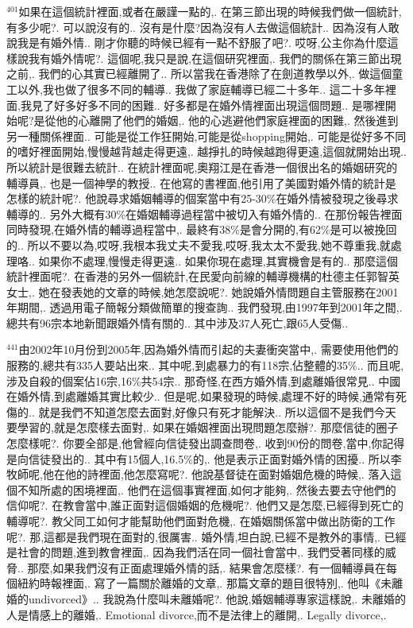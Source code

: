 \documentclass{book}
\begin{document}
$^{401}$如果在這個統計裡面,或者在嚴謹一點的,.
在第三節出現的時候我們做一個統計,有多少呢?.
可以說沒有的..
沒有是什麼?因為沒有人去做這個統計..
因為沒有人敢說我是有婚外情..
剛才你聽的時候已經有一點不舒服了吧?.
哎呀,公主你為什麼這樣說我有婚外情呢?.
這個呢,我只是說,在這個研究裡面,.
我們的關係在第三節出現之前,.
我們的心其實已經離開了..
所以當我在香港除了在劍道教學以外,.
做這個童工以外,我也做了很多不同的輔導..
我做了家庭輔導已經二十多年..
這二十多年裡面,我見了好多好多不同的困難..
好多都是在婚外情裡面出現這個問題..
是哪裡開始呢?是從他的心離開了他們的婚姻,.
他的心逃避他們家庭裡面的困難,.
然後進到另一種關係裡面..
可能是從工作狂開始,可能是從shopping開始,.
可能是從好多不同的嗜好裡面開始,慢慢越背越走得更遠,.
越掙扎的時候越跑得更遠,這個就開始出現..
所以統計是很難去統計..
在統計裡面呢,奧翔江是在香港一個很出名的婚姻研究的輔導員,.
也是一個神學的教授..
在他寫的書裡面,他引用了美國對婚外情的統計是怎樣的統計呢?.
他說尋求婚姻輔導的個案當中有25-30\%在婚外情被發現之後尋求輔導的..
另外大概有30\%在婚姻輔導過程當中被切入有婚外情的..
在那份報告裡面同時發現,在婚外情的輔導過程當中,.
最終有38\%是會分開的,有62\%是可以被挽回的..
所以不要以為,哎呀,我根本我丈夫不愛我,哎呀,我太太不愛我,她不尊重我,就處理咯..
如果你不處理,慢慢走得更遠..
如果你現在處理,其實機會是有的..
那麼這個統計裡面呢?.
在香港的另外一個統計,在民愛向前線的輔導機構的杜德主任郭智英女士,.
她在發表她的文章的時候,她怎麼說呢?.
她說婚外情問題自主管服務在2001年期間,.
透過用電子簡報分類做簡單的搜查詢..
我們發現,由1997年到2001年之間,.
總共有96宗本地新聞跟婚外情有關的..
其中涉及37人死亡,跟65人受傷..

$^{441}$由2002年10月份到2005年,因為婚外情而引起的夫妻衝突當中,.
需要使用他們的服務的,總共有335人要站出來..
其中呢,到處暴力的有118宗,佔整體的35\%..
而且呢,涉及自殺的個案佔16宗,16\%共54宗..
那奇怪,在西方婚外情,到處離婚很常見..
中國在婚外情,到處離婚其實比較少..
但是呢,如果發現的時候,處理不好的時候,通常有死傷的..
就是我們不知道怎麼去面對,好像只有死才能解決..
所以這個不是我們今天要學習的,就是怎麼樣去面對,.
如果在婚姻裡面出現問題怎麼辦?.
那麼信徒的圈子怎麼樣呢?.
你要全部是,他曾經向信徒發出調查問卷,.
收到90份的問卷,當中,你記得是向信徒發出的..
其中有15個人,16.5\%的,.
他是表示正面對婚外情的困擾..
所以李牧師呢,他在他的詩裡面,他怎麼寫呢?.
他說基督徒在面對婚姻危機的時候,.
落入這個不知所處的困境裡面,.
他們在這個事實裡面,如何才能夠,.
然後去要去守他們的信仰呢?.
在教會當中,誰正面對這個婚姻的危機呢?.
他們又是怎麼,已經得到死亡的輔導呢?.
教父同工如何才能幫助他們面對危機,.
在婚姻關係當中做出防衛的工作呢?.
那,這都是我們現在面對的,很厲害..
婚外情,坦白說,已經不是教外的事情,.
已經是社會的問題,進到教會裡面,.
因為我們活在同一個社會當中,.
我們受著同樣的威脅..
那麼,如果我們沒有正面處理婚外情的話,.
結果會怎麼樣?.
有一個輔導員在每個紐約時報裡面,.
寫了一篇關於離婚的文章,.
那篇文章的題目很特別,.
他叫《未離婚的undivorced》..
我說為什麼叫未離婚呢?.
他說,婚姻輔導專家這樣說,.
未離婚的人是情感上的離婚,.
Emotional divorce,而不是法律上的離開,.
Legally divorce,.
\end{document}
